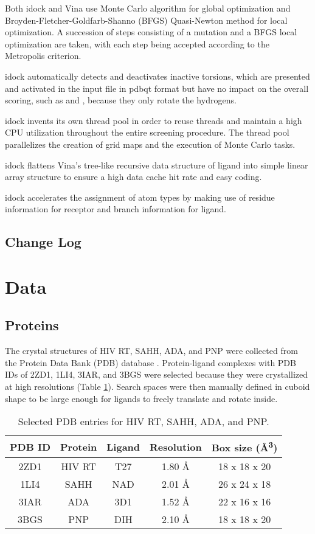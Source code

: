 \documentclass[10pt,conference,compsocconf]{../IEEEtran}
\begin{document}
Both idock and Vina use Monte Carlo algorithm for global optimization and Broyden-Fletcher-Goldfarb-Shanno (BFGS) \cite{786} Quasi-Newton method for local optimization. A succession of steps consisting of a mutation and a BFGS local optimization are taken, with each step being accepted according to the Metropolis criterion.

idock automatically detects and deactivates inactive torsions, which are presented and activated in the input file in pdbqt format but have no impact on the overall scoring, such as  and , because they only rotate the hydrogens.

idock invents its own thread pool in order to reuse threads and maintain a high CPU utilization throughout the entire screening procedure. The thread pool parallelizes the creation of grid maps and the execution of Monte Carlo tasks.

idock flattens Vina's tree-like recursive data structure of ligand into simple linear array structure to ensure a high data cache hit rate and easy coding.

idock accelerates the assignment of atom types by making use of residue information for receptor and branch information for ligand.

\subsection{Change Log}



\section{Data}

\subsection{Proteins}

The crystal structures of HIV RT, SAHH, ADA, and PNP were collected from the Protein Data Bank (PDB) database \cite{539,537}. Protein-ligand complexes with PDB IDs of 2ZD1, 1LI4, 3IAR, and 3BGS were selected because they were crystallized at high resolutions (Table \ref{tab:SelectedPDBEntries}). Search spaces were then manually defined in cuboid shape to be large enough for ligands to freely translate and rotate inside.

\begin{table}
\centering
\begin{tabular*}
{\linewidth}
{@{\extracolsep{\fill}}ccccc}
\toprule
PDB ID & Protein & Ligand & Resolution & Box size (\AA\textsuperscript{3})\\
\midrule
2ZD1 & HIV RT & T27 & 1.80 \AA & 18 x 18 x 20\\
1LI4 & SAHH   & NAD & 2.01 \AA & 26 x 24 x 18\\
3IAR & ADA    & 3D1 & 1.52 \AA & 22 x 16 x 16\\
3BGS & PNP    & DIH & 2.10 \AA & 18 x 18 x 20\\
\bottomrule
\end{tabular*}
\caption{Selected PDB entries for HIV RT, SAHH, ADA, and PNP.}
\label{tab:SelectedPDBEntries}
\end{table}
\end{document}
